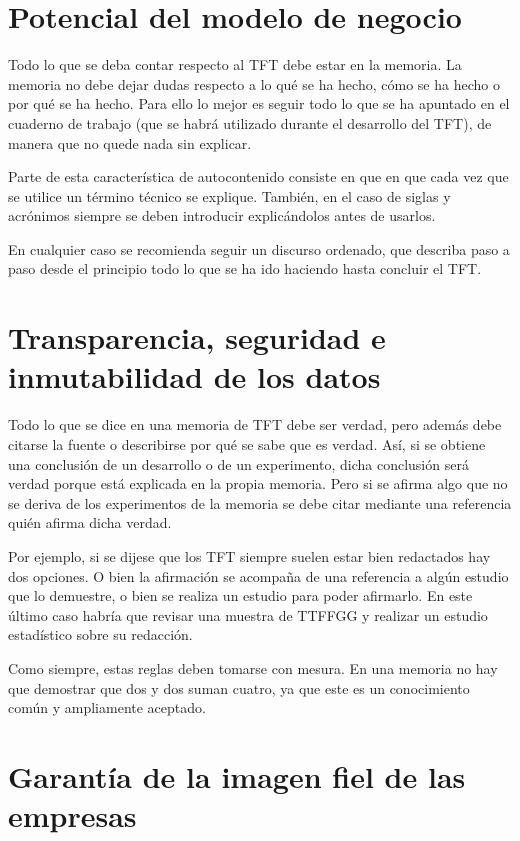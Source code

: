 \documentclass[12pt,spanish,chapterprefix, numbers=noenddot]{book}
\numberwithin{equation}{section}
\numberwithin{figure}{section}
\begin{document}
    \section{Potencial del modelo de negocio}

    Todo lo que se deba contar respecto al TFT debe estar en la memoria.
    La memoria no debe dejar dudas respecto a lo qué se ha hecho, cómo
    se ha hecho o por qué se ha hecho. Para ello lo mejor es seguir todo
    lo que se ha apuntado en el cuaderno de trabajo (que se habrá utilizado
    durante el desarrollo del TFT), de manera que no quede nada sin explicar.

    Parte de esta característica de autocontenido consiste en que en que
    cada vez que se utilice un término técnico se explique. También, en
    el caso de siglas y acrónimos siempre
    se deben introducir explicándolos antes de usarlos.

    En cualquier caso se recomienda seguir un discurso ordenado, que describa
    paso a paso desde el principio todo lo que se ha ido haciendo hasta
    concluir el TFT.

    \section{Transparencia, seguridad e inmutabilidad de los datos}

    Todo lo que se dice en una memoria de TFT debe ser verdad, pero además
    debe citarse la fuente o describirse por qué se sabe que es verdad.
    Así, si se obtiene una conclusión de un desarrollo o de un experimento,
    dicha conclusión será verdad porque está explicada en la propia memoria.
    Pero si se afirma algo que no se deriva de los experimentos de la
    memoria se debe citar mediante una referencia quién afirma dicha verdad.

    Por ejemplo, si se dijese que los TFT siempre suelen estar bien redactados
    hay dos opciones. O bien la afirmación se acompaña de una referencia
    a algún estudio que lo demuestre, o bien se realiza un estudio para
    poder afirmarlo. En este último caso habría que revisar una muestra
    de TTFFGG y realizar un estudio estadístico sobre su redacción.

    Como siempre, estas reglas deben tomarse con mesura. En una memoria
    no hay que demostrar que dos y dos suman cuatro, ya que este es un
    conocimiento común y ampliamente aceptado.

    \section{Garantía de la imagen fiel de las empresas}
\end{document}
